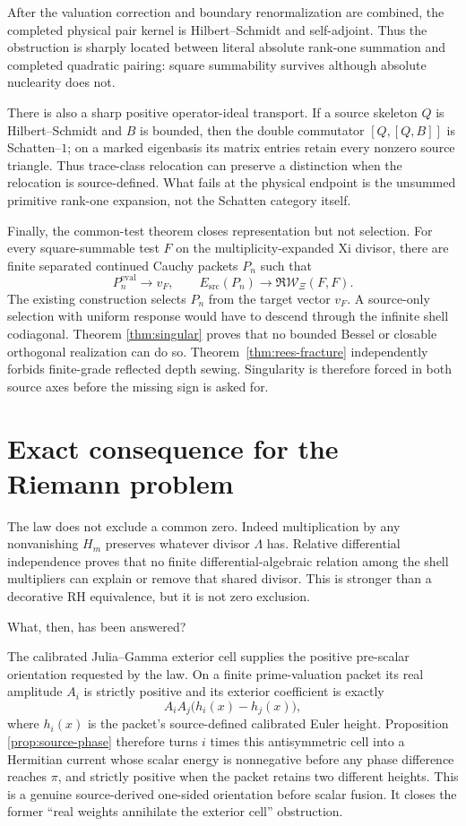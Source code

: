 \documentclass[11pt]{article}
\theoremstyle{definition}
\theoremstyle{remark}
\begin{document}
After the valuation correction and boundary renormalization are combined, the completed physical
pair kernel is Hilbert--Schmidt and self-adjoint.  Thus the obstruction is sharply located between
literal absolute rank-one summation and completed quadratic pairing: square summability survives
although absolute nuclearity does not.

There is also a sharp positive operator-ideal transport.  If a source skeleton $Q$ is
Hilbert--Schmidt and $B$ is bounded, then the double commutator
$[Q,[Q,B]]$ is Schatten--$1$; on a marked eigenbasis its matrix entries retain every nonzero
source triangle.  Thus trace-class relocation can preserve a distinction when the relocation is
source-defined.  What fails at the physical endpoint is the unsummed primitive rank-one
expansion, not the Schatten category itself.

Finally, the common-test theorem closes representation but not selection.  For every
square-summable test $F$ on the multiplicity-expanded Xi divisor, there are finite separated
continued Cauchy packets $P_n$ such that
\[
 P_n^{\mathrm{eval}}\longrightarrow v_F,
 \qquad
 E_{\mathrm{src}}(P_n)\longrightarrow\Re\mathcal W_\Xi(F,F).
 \tag{7.6}
\]
The existing construction selects $P_n$ from the target vector $v_F$.  A source-only selection
with uniform response would have to descend through the infinite shell codiagonal.  Theorem
\ref{thm:singular} proves that no bounded Bessel or closable orthogonal realization can do so.
Theorem~\ref{thm:rees-fracture} independently forbids finite-grade reflected depth sewing.
Singularity is therefore forced in both source axes before the missing sign is asked for.

\section{Exact consequence for the Riemann problem}

The law does not exclude a common zero.  Indeed multiplication by any nonvanishing $H_m$ preserves
whatever divisor $\Lambda$ has.  Relative differential independence proves that no finite
differential-algebraic relation among the shell multipliers can explain or remove that shared
divisor.  This is stronger than a decorative RH equivalence, but it is not zero exclusion.

What, then, has been answered?

The calibrated Julia--Gamma exterior cell supplies the positive pre-scalar orientation requested
by the law.  On a finite prime-valuation packet its real amplitude $A_i$ is strictly positive and
its exterior coefficient is exactly
\[
 A_iA_j\bigl(h_i(x)-h_j(x)\bigr),
\]
where $h_i(x)$ is the packet's source-defined calibrated Euler height.  Proposition
\ref{prop:source-phase} therefore turns $i$ times this antisymmetric cell into a Hermitian current
whose scalar energy is nonnegative before any phase difference reaches $\pi$, and strictly
positive when the packet retains two different heights.  This is a genuine source-derived
one-sided orientation before scalar fusion.  It closes the former ``real weights annihilate the
exterior cell'' obstruction.
\end{document}
